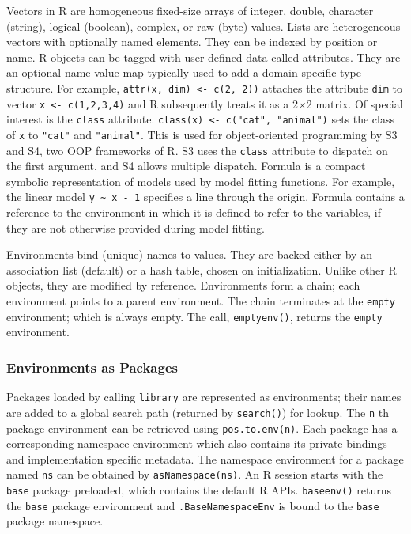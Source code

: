 \documentclass[10pt,review,sigplan,anonymous=true]{acmart}
\newcommand{\code}[1]{\lstinline |#1|\xspace}
\begin{document}
Vectors in R are homogeneous fixed-size arrays of integer, double, character
(string), logical (boolean), complex, or raw (byte) values. Lists are
heterogeneous vectors with optionally named elements. They can be indexed by
position or name. R objects can be tagged with user-defined data called
attributes. They are an optional name value map typically used to add a
domain-specific type structure. For example, \code{attr(x, dim) <- c(2, 2))}
attaches the attribute \code{dim} to vector \code{x <- c(1,2,3,4)} and R
subsequently treats it as a 2$\times$2 matrix. Of special interest is the
\code{class} attribute. \code{class(x) <- c("cat", "animal")} sets the class of
\code{x} to \code{"cat"} and \code{"animal"}. This is used for object-oriented
programming by S3 and S4, two OOP frameworks of R. S3 uses the \code{class}
attribute to dispatch on the first argument, and S4 allows multiple dispatch.
Formula is a compact symbolic representation of models used by model fitting
functions. For example, the linear model \code{y ~ x - 1} specifies a line
through the origin. Formula contains a reference to the environment in which it
is defined to refer to the variables, if they are not otherwise provided during
model fitting.

Environments bind (unique) names to values. They are backed either by an
association list (default) or a hash table, chosen on initialization. Unlike
other R objects, they are modified by reference. Environments form a chain; each
environment points to a parent environment. The chain terminates at the
\code{empty} environment; which is always empty. The call, \code{emptyenv()},
returns the \code{empty} environment.

\subsubsection{Environments as Packages}

Packages loaded by calling \code{library} are represented as environments; their
names are added to a global search path (returned by \code{search()}) for
lookup. The \code{n}th package environment can be retrieved using
\code{pos.to.env(n)}. Each package has a corresponding namespace environment
which also contains its private bindings and implementation specific metadata.
The namespace environment for a package named \code{ns} can be obtained by
\code{asNamespace(ns)}. An R session starts with the \code{base} package
preloaded, which contains the default R APIs. \code{baseenv()} returns the
\code{base} package environment and \code{.BaseNamespaceEnv} is bound to the
\code{base} package namespace.
\end{document}
